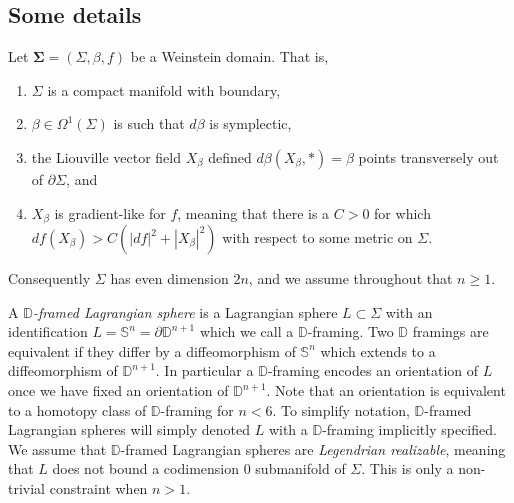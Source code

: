 \documentclass[11pt]{amsart}
\newcommand{\thicc}[1]{\pmb{#1}}
\newcommand{\disk}{\mathbb{D}}
\newcommand{\be}{\begin{enumerate}}
\newcommand{\ee}{\end{enumerate}}
\newcommand{\sphere}{\mathbb{S}}
\newcommand{\LagTuple}{\thicc{L}}
\newtheorem{ex}[thm]{Example}
\begin{document}
\begin{comment}
\begin{ex}
Suppose that $\mu$ and $\lambda$ are meridian and longitude circles on a punctured torus $T \setminus \{ pt \}$. Then $\LagTuple^{+} = (\mu, \lambda, \mu)$ and $\LagTuple^{-} = (\lambda, \mu, \lambda)$ give a DPF, determining a $\dim=4$ convex hypersurface. Indeed $\tau_{\mu}\tau_{\lambda}\tau_{\mu} = \tau_{\lambda}\tau_{\mu}\tau_{\lambda}$ is the classical braid relation. This can be generalized to higher dimensions by looking at matching paths in $A_{3}$ Milnor fibers.
\end{ex}
\end{comment}

\subsection{Some details}

Let $\thicc{\Sigma} = (\Sigma, \beta, f)$ be a Weinstein domain. That is,
\be
\item $\Sigma$ is a compact manifold with boundary,
\item $\beta \in \Omega^{1}(\Sigma)$ is such that $d\beta$ is symplectic,
\item the Liouville vector field $X_{\beta}$ defined $d\beta(X_{\beta}, \ast) = \beta$ points transversely out of $\partial \Sigma$, and
\item $X_{\beta}$ is gradient-like for $f$, meaning that there is a $C > 0$ for which $df(X_{\beta}) > C(|df|^{2} + |X_{\beta}|^{2})$ with respect to some metric on $\Sigma$.
\ee
Consequently $\Sigma$ has even dimension $2n$, and we assume throughout that $n \geq 1$.

A \emph{$\disk$-framed Lagrangian sphere} is a Lagrangian sphere $L \subset \Sigma$ with an identification $L = \sphere^{n} = \partial \disk^{n+1}$ which we call a $\disk$-framing. Two $\disk$ framings are equivalent if they differ by a diffeomorphism of $\sphere^{n}$ which extends to a diffeomorphism of $\disk^{n+1}$. In particular a $\disk$-framing encodes an orientation of $L$ once we have fixed an orientation of $\disk^{n+1}$. Note that an orientation is equivalent to a homotopy class of $\disk$-framing for $n < 6$. To simplify notation, $\disk$-framed Lagrangian spheres will simply denoted $L$ with a $\disk$-framing implicitly specified. We assume that $\disk$-framed Lagrangian spheres are \emph{Legendrian realizable}, meaning that $L$ does not bound a codimension $0$ submanifold of $\Sigma$. This is only a non-trivial constraint when $n > 1$.
\end{document}
